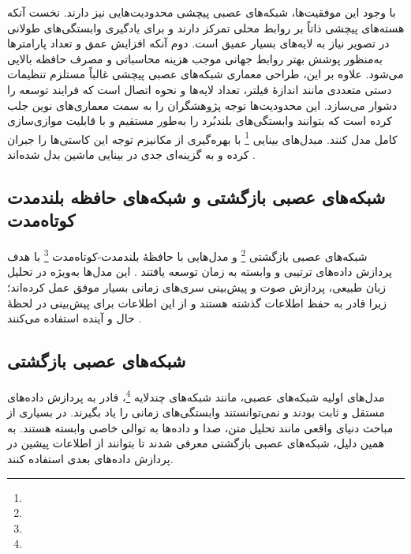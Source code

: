 با وجود این موفقیت‌ها، شبکه‌های عصبی پیچشی محدودیت‌هایی نیز دارند. نخست آنکه هسته‌های پیچشی ذاتاً بر روابط محلی تمرکز دارند و برای یادگیری وابستگی‌های طولانی در تصویر نیاز به لایه‌های بسیار عمیق است. دوم آنکه افزایش عمق و تعداد پارامترها به‌منظور پوشش بهتر روابط جهانی موجب هزینه محاسباتی و مصرف حافظه بالایی می‌شود. علاوه بر این، طراحی معماری شبکه‌های عصبی پیچشی غالباً مستلزم تنظیمات دستی متعددی مانند اندازهٔ فیلتر، تعداد لایه‌ها و نحوه اتصال است که فرایند توسعه را دشوار می‌سازد. این محدودیت‌ها توجه پژوهشگران را به سمت معماری‌های نوین جلب کرده است که بتوانند وابستگی‌های بلندبُرد را به‌طور مستقیم و با قابلیت موازی‌سازی کامل مدل کنند. مبدل‌های بینایی \footnote{} با بهره‌گیری از مکانیزم توجه این کاستی‌ها را جبران کرده و به گزینه‌ای جدی در بینایی ماشین بدل شده‌اند \cite{dosovitskiy2020image}.



\subsection{شبکه‌های عصبی بازگشتی و شبکه‌های حافظه بلندمدت کوتاه‌مدت}
شبکه‌های عصبی بازگشتی \footnote{} و مدل‌هایی با حافظهٔ بلندمدت-کوتاه‌مدت \footnote{} با هدف پردازش داده‌های ترتیبی و وابسته به زمان توسعه یافتند
\cite{rumelhart1986learning,hochreiter1997long}.
این مدل‌ها به‌ویژه در تحلیل زبان طبیعی، پردازش صوت و پیش‌بینی سری‌های زمانی بسیار موفق عمل کرده‌اند؛ زیرا قادر به حفظ اطلاعات گذشته هستند و از این اطلاعات برای پیش‌بینی در لحظهٔ حال و آینده استفاده می‌کنند
\cite{gers1999learning}.

\subsection{شبکه‌های عصبی بازگشتی}
مدل‌های اولیه شبکه‌های عصبی، مانند شبکه‌های چندلایه \footnote{}، قادر به پردازش داده‌های مستقل و ثابت بودند و نمی‌توانستند وابستگی‌های زمانی را یاد بگیرند\cite{bishop2006pattern}.
در بسیاری از مباحث دنیای واقعی مانند تحلیل متن، صدا و  داده‌ها به توالی خاصی وابسته هستند. به همین دلیل، شبکه‌های عصبی بازگشتی معرفی شدند تا بتوانند از اطلاعات پیشین در پردازش داده‌های بعدی استفاده کنند\cite{rumelhart1986learning}.




